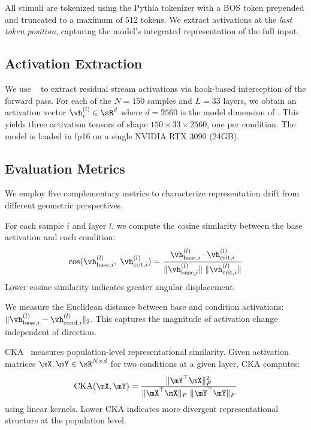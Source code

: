 All stimuli are tokenized using the Pythia tokenizer with a BOS token prepended and truncated to a maximum of 512 tokens. We extract activations at the \emph{last token position}, capturing the model's integrated representation of the full input.

\subsection{Activation Extraction}

We use \tlens~\citep{nanda2022transformerlens} to extract residual stream activations via hook-based interception of the forward pass. For each of the $N = 150$ samples and $L = 33$ layers, we obtain an activation vector $\vh^{(l)}_i \in \sR^{d}$ where $d = 2560$ is the model dimension of \pythia. This yields three activation tensors of shape $150 \times 33 \times 2560$, one per condition. The model is loaded in fp16 on a single NVIDIA RTX 3090 (24GB).

\subsection{Evaluation Metrics}
\label{sec:metrics}

We employ five complementary metrics to characterize representation drift from different geometric perspectives.

For each sample $i$ and layer $l$, we compute the cosine similarity between the base activation and each condition:
\begin{equation}
    \text{cos}(\vh^{(l)}_{\text{base},i},\; \vh^{(l)}_{\text{crit},i}) = \frac{\vh^{(l)}_{\text{base},i} \cdot \vh^{(l)}_{\text{crit},i}}{\|\vh^{(l)}_{\text{base},i}\| \; \|\vh^{(l)}_{\text{crit},i}\|}
\label{eq:cosine}
\end{equation}
Lower cosine similarity indicates greater angular displacement.

We measure the Euclidean distance between base and condition activations: $\|\vh^{(l)}_{\text{base},i} - \vh^{(l)}_{\text{cond},i}\|_2$. This captures the magnitude of activation change independent of direction.

CKA~\citep{kornblith2019similarity} measures population-level representational similarity. Given activation matrices $\mX, \mY \in \sR^{N \times d}$ for two conditions at a given layer, CKA computes:
\begin{equation}
    \text{CKA}(\mX, \mY) = \frac{\|\mY^\top \mX\|_F^2}{\|\mX^\top \mX\|_F \; \|\mY^\top \mY\|_F}
\label{eq:cka}
\end{equation}
using linear kernels. Lower CKA indicates more divergent representational structure at the population level.

